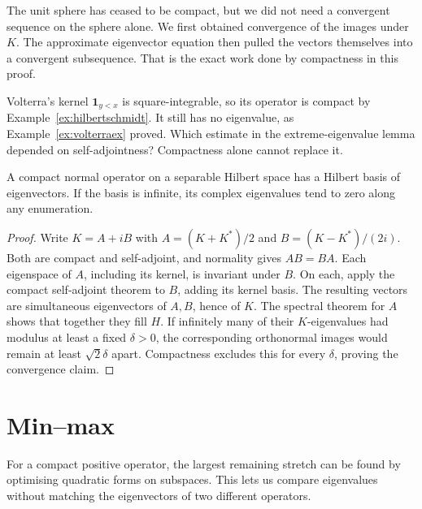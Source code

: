 \begin{beauty}
The unit sphere has ceased to be compact, but we did not need a convergent sequence on the sphere alone. We first obtained convergence of the images under $K$. The approximate eigenvector equation then pulled the vectors themselves into a convergent subsequence. That is the exact work done by compactness in this proof.
\end{beauty}

\begin{think}
Volterra's kernel $\mathbf1_{y<x}$ is square-integrable, so its operator is compact by Example~\ref{ex:hilbertschmidt}. It still has no eigenvalue, as Example~\ref{ex:volterraex} proved. Which estimate in the extreme-eigenvalue lemma depended on self-adjointness? Compactness alone cannot replace it.
\end{think}

\begin{corollary}\label{cor:normal}
A compact normal operator on a separable Hilbert space has a Hilbert basis of eigenvectors. If the basis is infinite, its complex eigenvalues tend to zero along any enumeration.
\end{corollary}
\begin{proof}
Write $K=A+iB$ with $A=(K+K^*)/2$ and $B=(K-K^*)/(2i)$. Both are compact and self-adjoint, and normality gives $AB=BA$. Each eigenspace of $A$, including its kernel, is invariant under $B$. On each, apply the compact self-adjoint theorem to $B$, adding its kernel basis. The resulting vectors are simultaneous eigenvectors of $A,B$, hence of $K$. The spectral theorem for $A$ shows that together they fill $H$. If infinitely many of their $K$-eigenvalues had modulus at least a fixed $\delta>0$, the corresponding orthonormal images would remain at least $\sqrt2\delta$ apart. Compactness excludes this for every $\delta$, proving the convergence claim.
\end{proof}

\section{Min--max}

For a compact positive operator, the largest remaining stretch can be found by optimising quadratic forms on subspaces. This lets us compare eigenvalues without matching the eigenvectors of two different operators.


